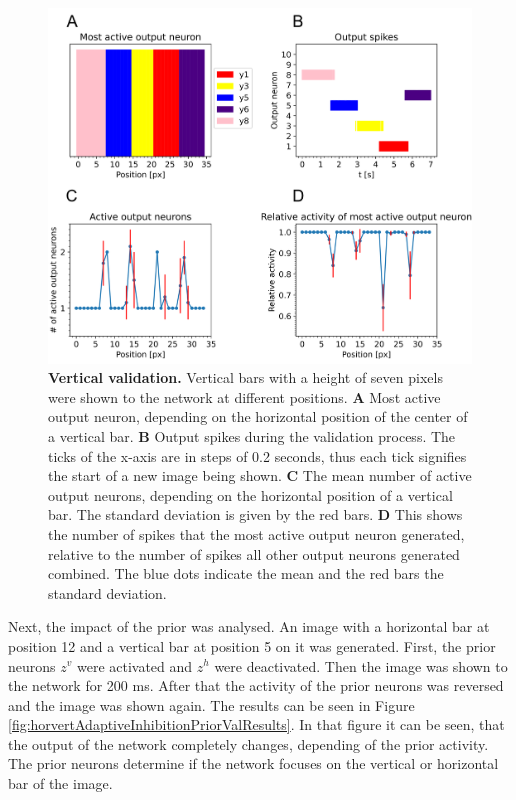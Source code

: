 \begin{figure}
  \includegraphics[width=\linewidth]{figures/horvertAdaptiveInh/vertical_validation.png}
  \caption{\textbf{Vertical validation.} Vertical bars with a height of seven pixels were shown to the network at different positions. \textbf{A} Most active output neuron, depending on the horizontal position of the center of a vertical bar. \textbf{B} Output spikes during the validation process. The ticks of the x-axis are in steps of 0.2 seconds, thus each tick signifies the start of a new image being shown. \textbf{C} The mean number of active output neurons, depending on the horizontal position of a vertical bar. The standard deviation is given by the red bars. \textbf{D} This shows the number of spikes that the most active output neuron generated, relative to the number of spikes all other output neurons generated combined. The blue dots indicate the mean and the red bars the standard deviation. }
  \label{fig:horvertAdaptiveInhibitionVerticalValResults}
\end{figure}

Next, the impact of the prior was analysed. An image with a horizontal bar at position 12 and a vertical bar at position 5 on it was generated. First, the prior neurons $z^v$ were activated and $z^h$ were deactivated. Then the image was shown to the network for 200 ms. After that the activity of the prior neurons was reversed and the image was shown again. The results can be seen in Figure \ref{fig:horvertAdaptiveInhibitionPriorValResults}. In that figure it can be seen, that the output of the network completely changes, depending of the prior activity. The prior neurons determine if the network focuses on the vertical or horizontal bar of the image.

